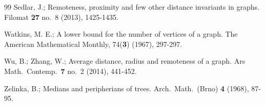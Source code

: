 \documentclass[a4paper,11pt]{article}
\begin{document}
\begin{thebibliography}{99}
 Sedlar, J.; 
     Remoteness, proximity and few other distance invariants in graphs. 
     Filomat {\bf 27} no.\ 8 (2013), 1425-1435.   
     
  
 Watkins, M. E.; 
     A lower bound for the number of vertices of a graph. 
     The American Mathematical Monthly, 74({\bf 3}) (1967), 297-297.
  
 Wu, B.; Zhang, W.;
     Average distance, radius and remoteness of a graph.
     Ars Math.\ Contemp.\ {\bf 7} no.\ 2 (2014), 441-452.

 Zelinka, B.;
     Medians and peripherians of trees.
     Arch.\ Math.\ (Brno) {\bf 4} (1968), 87-95.



 

\end{thebibliography}
\end{document}
